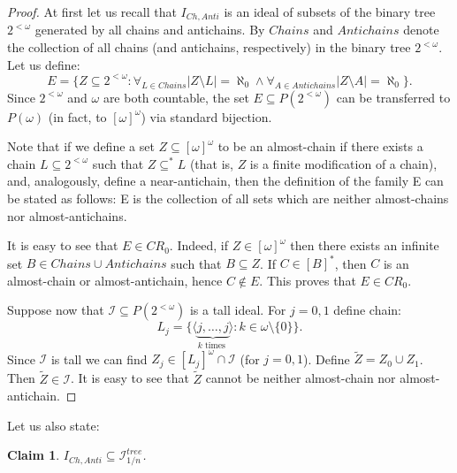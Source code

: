 \documentclass[12pt]{amsart}
\theoremstyle{plain}
\newtheorem{claim}[theorem]{Claim}
\theoremstyle{definition}
\theoremstyle{remark}
\newcommand{\infsub}{[\omega]^{\omega}}
\newcommand{\cI}{\mathcal{I}}
\newcommand{\idealChainsAntichains}{I_{\mathit{Ch}, \mathit{Anti}}}
\newcommand{\idealHarmonicznyTree}{\cI^{\mathit{tree}}_{1/n}}
\begin{document}
\begin{proof}
  At first let us recall that $\idealChainsAntichains$
  is an ideal of subsets of the binary tree $2^{<\omega}$
  generated by all chains and antichains.
  By $\mathit{Chains}$ and $\mathit{Antichains}$ denote the
  collection of all chains (and antichains, respectively)
  in the binary tree $2^{<\omega}$.
  Let us define:
  \begin{equation}
    E = \lbrace Z \subseteq 2^{<\omega} \colon \forall_{L \in \mathit{Chains}}
    |Z \setminus L| = \aleph_0 \wedge
    \forall_{A \in \mathit{Antichains}}
    |Z \setminus A| = \aleph_0\rbrace.
  \end{equation}
  Since $2^{<\omega}$ and $\omega$ are both countable,
  the set $E \subseteq P(2^{<\omega})$ can be transferred to $P(\omega)$
  (in fact, to $\infsub$) via standard bijection.
  
    Note that if we define a set $Z \subseteq \infsub$
  to be an almost-chain if there exists a chain $L\subseteq 2^{<\omega}$
  such that $Z \subseteq^* L$ (that is, $Z$ is a finite modification of a chain),
  and, analogously, define a near-antichain,
  then the definition of the family E can be stated as follows:
  E is the collection of all sets which are neither almost-chains nor almost-antichains.
  
    It is easy to see that $E \in CR_0$. Indeed, if $Z \in \infsub$ then
  there exists an infinite set
  $B \in \mathit{Chains} \cup \mathit{Antichains}$
  such that $B \subseteq Z$. If $C \in [B]^*$, then
  $C$ is an almost-chain or almost-antichain, hence
  $C \not\in E$. This proves that $E \in CR_0$.

  Suppose now that $\cI \subseteq P(2^{<\omega})$ is a tall ideal.
  For $j = 0,1$ define chain:
  \[
    L_j = \big\lbrace \langle \underbrace{j, \ldots, j}_{k\text{\ times\ }}\rangle \colon
    k \in \omega\setminus\lbrace 0 \rbrace \big\rbrace.
  \]
  Since $\cI$ is tall we can find $Z_j \in [L_j]^\omega \cap \cI$
  (for $j = 0,1$).
  Define $\tilde{Z} = Z_0 \cup Z_1$. Then $\tilde{Z} \in \cI$. It is
  easy to see that $\tilde{Z}$ cannot be neither almost-chain nor
  almost-antichain.
\end{proof}

Let us also state:
\begin{claim}
$\idealChainsAntichains \subseteq \idealHarmonicznyTree$.
\end{claim}
\end{document}
